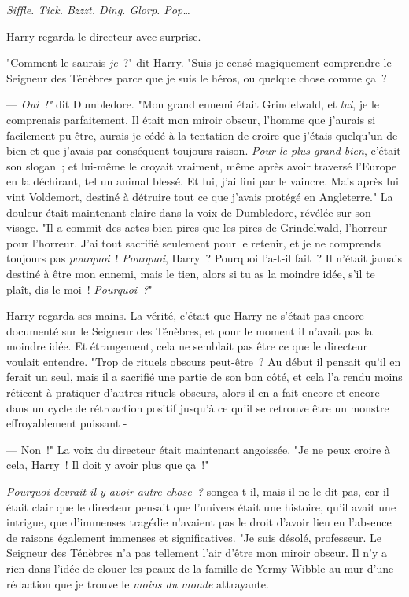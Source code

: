 \later

\emph{Siffle. Tick. Bzzzt. Ding. Glorp. Pop…}

Harry regarda le directeur avec surprise.

"Comment le saurais-\emph{je}~?" dit Harry. "Suis-je censé magiquement comprendre le Seigneur des Ténèbres parce que je suis le héros, ou quelque chose comme ça~?

--- \emph{Oui~!"} dit Dumbledore. "Mon grand ennemi était Grindelwald, et \emph{lui}, je le comprenais parfaitement. Il était mon miroir obscur, l'homme que j'aurais si facilement pu être, aurais-je cédé à la tentation de croire que j'étais quelqu'un de bien et que j'avais par conséquent toujours raison. \emph{Pour le plus grand bien}, c'était son slogan~; et lui-même le croyait vraiment, même après avoir traversé l'Europe en la déchirant, tel un animal blessé. Et lui, j'ai fini par le vaincre. Mais après lui vint Voldemort, destiné à détruire tout ce que j'avais protégé en Angleterre." La douleur était maintenant claire dans la voix de Dumbledore, révélée sur son visage. "Il a commit des actes bien pires que les pires de Grindelwald, l'horreur pour l'horreur. J'ai tout sacrifié seulement pour le retenir, et je ne comprends toujours pas \emph{pourquoi}~! \emph{Pourquoi}, Harry~? Pourquoi l'a-t-il fait~? Il n'était jamais destiné à être mon ennemi, mais le tien, alors si tu as la moindre idée, s'il te plaît, dis-le moi~! \emph{Pourquoi~?}"

Harry regarda ses mains. La vérité, c'était que Harry ne s'était pas encore documenté sur le Seigneur des Ténèbres, et pour le moment il n'avait pas la moindre idée. Et étrangement, cela ne semblait pas être ce que le directeur voulait entendre. "Trop de rituels obscurs peut-être~? Au début il pensait qu'il en ferait un seul, mais il a sacrifié une partie de son bon côté, et cela l'a rendu moins réticent à pratiquer d'autres rituels obscurs, alors il en a fait encore et encore dans un cycle de rétroaction positif jusqu'à ce qu'il se retrouve être un monstre effroyablement puissant -

--- Non~!" La voix du directeur était maintenant angoissée. "Je ne peux croire à cela, Harry~! Il doit y avoir plus que ça~!"

\emph{Pourquoi devrait-il y avoir autre chose~?} songea-t-il, mais il ne le dit pas, car il était clair que le directeur pensait que l'univers était une histoire, qu'il avait une intrigue, que d'immenses tragédie n'avaient pas le droit d'avoir lieu en l'absence de raisons également immenses et significatives. "Je suis désolé, professeur. Le Seigneur des Ténèbres n'a pas tellement l'air d'être mon miroir obscur. Il n'y a rien dans l'idée de clouer les peaux de la famille de Yermy Wibble au mur d'une rédaction que je trouve le \emph{moins du monde} attrayante.

